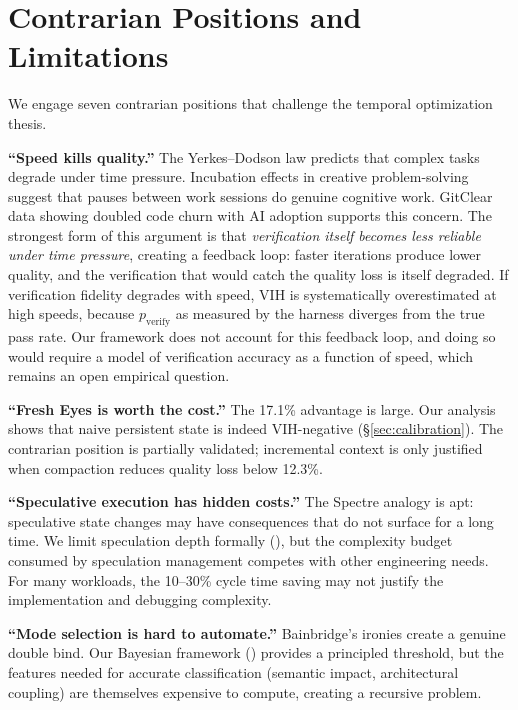 \documentclass[11pt, a4paper, logo, copyright]{googledeepmind}
\begin{document}
\section{Contrarian Positions and Limitations}\label{sec:contrarian}

We engage seven contrarian positions that challenge the temporal optimization thesis.

\textbf{``Speed kills quality.''} The Yerkes--Dodson law \citep{yerkes1908relation} predicts that complex tasks degrade under time pressure. Incubation effects in creative problem-solving \citep{sio2009incubation, wallas1926art} suggest that pauses between work sessions do genuine cognitive work. GitClear data showing doubled code churn with AI adoption \citep{gitclear2025} supports this concern. The strongest form of this argument is that \emph{verification itself becomes less reliable under time pressure}, creating a feedback loop: faster iterations produce lower quality, and the verification that would catch the quality loss is itself degraded. If verification fidelity degrades with speed, VIH is systematically overestimated at high speeds, because $p_{\mathrm{verify}}$ as measured by the harness diverges from the true pass rate. Our framework does not account for this feedback loop, and doing so would require a model of verification accuracy as a function of speed, which remains an open empirical question.

\textbf{``Fresh Eyes is worth the cost.''} The 17.1\% advantage is large. Our analysis shows that naive persistent state is indeed VIH-negative (\S\ref{sec:calibration}). The contrarian position is partially validated; incremental context is only justified when compaction reduces quality loss below 12.3\%.

\textbf{``Speculative execution has hidden costs.''} The Spectre analogy \citep{spectre2018} is apt: speculative state changes may have consequences that do not surface for a long time. We limit speculation depth formally (), but the complexity budget consumed by speculation management competes with other engineering needs. For many workloads, the 10--30\% cycle time saving may not justify the implementation and debugging complexity.

\textbf{``Mode selection is hard to automate.''} Bainbridge's ironies \citep{bainbridge1983ironies} create a genuine double bind. Our Bayesian framework () provides a principled threshold, but the features needed for accurate classification (semantic impact, architectural coupling) are themselves expensive to compute, creating a recursive problem.
\end{document}
